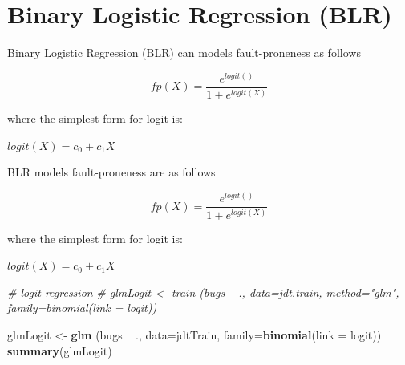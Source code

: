 \documentclass[]{book}
\newenvironment{Shaded}{\begin{snugshade}}{\end{snugshade}}
\newcommand{\KeywordTok}[1]{\textcolor[rgb]{0.13,0.29,0.53}{\textbf{{#1}}}}
\newcommand{\DataTypeTok}[1]{\textcolor[rgb]{0.13,0.29,0.53}{{#1}}}
\newcommand{\DecValTok}[1]{\textcolor[rgb]{0.00,0.00,0.81}{{#1}}}
\newcommand{\StringTok}[1]{\textcolor[rgb]{0.31,0.60,0.02}{{#1}}}
\newcommand{\CommentTok}[1]{\textcolor[rgb]{0.56,0.35,0.01}{\textit{{#1}}}}
\newcommand{\OtherTok}[1]{\textcolor[rgb]{0.56,0.35,0.01}{{#1}}}
\newcommand{\NormalTok}[1]{{#1}}
\begin{document}
\section{Binary Logistic Regression
(BLR)}\label{binary-logistic-regression-blr}

Binary Logistic Regression (BLR) can models fault-proneness as follows

\[fp(X) = \frac{e^{logit()}}{1 + e^{logit(X)}}\]

where the simplest form for logit is:

\(logit(X) = c_{0} + c_{1}X\)

\begin{Shaded}
\end{Shaded}

BLR models fault-proneness are as follows

\[fp(X) = \frac{e^{logit()}}{1 + e^{logit(X)}}\]

where the simplest form for logit is:

\(logit(X) = c_{0} + c_{1}X\)

\begin{Shaded}
\begin{Highlighting}[]
\CommentTok{# logit regression}
\CommentTok{# glmLogit <- train (bugs ~ ., data=jdt.train, method="glm", family=binomial(link = logit))       }

\NormalTok{glmLogit <-}\StringTok{ }\KeywordTok{glm} \NormalTok{(bugs ~}\StringTok{ }\NormalTok{., }\DataTypeTok{data=}\NormalTok{jdtTrain, }\DataTypeTok{family=}\KeywordTok{binomial}\NormalTok{(}\DataTypeTok{link =} \NormalTok{logit))}
\KeywordTok{summary}\NormalTok{(glmLogit)}
\end{Highlighting}
\end{Shaded}
\end{document}
